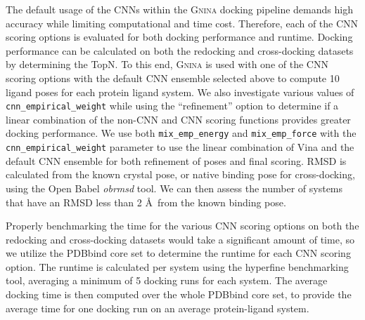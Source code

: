 \documentclass[journal=jcisd8,manuscript=article]{achemso}
\begin{document}
The default usage of the CNNs within the \textsc{Gnina} docking pipeline demands high accuracy while limiting computational and time cost. Therefore, each of the CNN scoring options is evaluated for both docking performance and runtime. Docking performance can be calculated on both the redocking and cross-docking datasets by determining the TopN. To this end, \textsc{Gnina} is used with one of the CNN scoring options with the default CNN ensemble selected above to compute 10 ligand poses for each protein ligand system. We also investigate various values of \texttt{cnn\_empirical\_weight} while using the ``refinement'' option to determine if a linear combination of the non-CNN and CNN scoring functions provides greater docking performance. We use both \texttt{mix\_emp\_energy} and \texttt{mix\_emp\_force} with the \texttt{cnn\_empirical\_weight} parameter to use the linear combination of Vina and the default CNN ensemble for both refinement of poses and final scoring. RMSD is calculated from the known crystal pose, or native binding pose for cross-docking, using the Open Babel \textit{obrmsd} tool. We can then assess the number of systems that have an RMSD less than 2 \AA~from the known binding pose. 

Properly benchmarking the time for the various CNN scoring options on both the redocking and cross-docking datasets would take a significant amount of time, so we utilize the PDBbind core set to determine the runtime for each CNN scoring option. The runtime is calculated per system using the hyperfine benchmarking tool\cite{hyperfine}, averaging a minimum of 5 docking runs for each system. The average docking time is then computed over the whole PDBbind core set, to provide the average time for one docking run on an average protein-ligand system.
\end{document}
